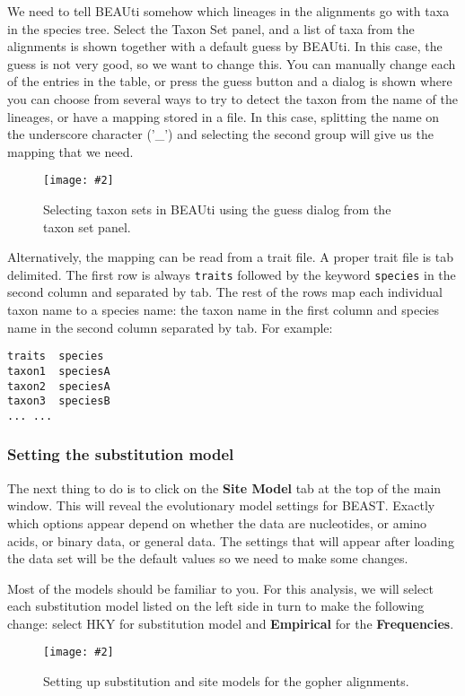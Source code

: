\documentclass{article}
\newcommand{\includeimage}[2][]{%
\texttt{[image: \#2]}
}
\begin{document}
We need to tell BEAUti somehow which lineages in the alignments go with taxa in the species tree. Select the Taxon Set panel, and a list of taxa from the alignments is shown together with a default guess by BEAUti. In this case, the guess is not very good, so we want to change this. You can manually change each of the entries in the table, or press the guess button and a dialog is shown where you can choose from several ways to try to detect the taxon from the name of the lineages, or have a mapping stored in a file. In this case, splitting the name on the underscore character ('\_') and selecting the second group will give us the mapping that we need.

\begin{figure}
\centering
\includeimage[width=\textwidth]{figures/BEAUti_Guess_Taxonsets}

\caption{\label{fig.taxonset} Selecting taxon sets in BEAUti using the guess dialog from the taxon set panel.}
\end{figure}


Alternatively, the mapping can be read from a trait file.
A proper trait file is tab delimited. The first row is always \texttt{traits} followed by the keyword \texttt{species} in the second column and separated by tab. The rest of the rows map each individual taxon name to a species name: the taxon name in the first column and species name in the second column separated by tab. For example:

\begin{verbatim}
traits	species
taxon1	speciesA
taxon2	speciesA
taxon3	speciesB
... ...
\end{verbatim}



\subsubsection*{Setting the substitution model}

The next thing to do is to click on the {\bf Site Model} tab at the top of the
main window. This will reveal the evolutionary model settings for
BEAST. Exactly which options appear depend on whether the data are
nucleotides, or amino acids, or binary data, or general data.
The settings that will appear after loading the data set will
be the default values so we need to make some changes. 

Most of the models should be familiar to you. For this analysis, we
will select each substitution model listed on the 
left side in turn to make the following change: select HKY for substitution model
and \textbf{Empirical} for the \textbf{Frequencies}. 
\begin{figure}
\centering
\includeimage[width=\textwidth]{figures/BEAUti_Site_Model}

\caption{\label{fig.sitemodel} Setting up substitution and site models for the gopher alignments.}
\end{figure}
\end{document}

